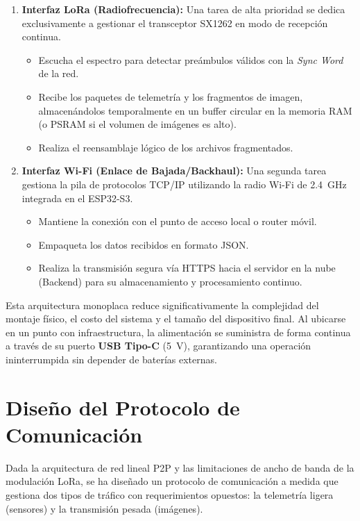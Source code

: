 \begin{enumerate}
  \item \textbf{Interfaz LoRa (Radiofrecuencia):}
    Una tarea de alta prioridad se dedica exclusivamente a gestionar el transceptor SX1262 en modo de recepción continua.
    \begin{itemize}
      \item Escucha el espectro para detectar preámbulos válidos con la \textit{Sync Word} de la red.
      \item Recibe los paquetes de telemetría y los fragmentos de imagen, almacenándolos temporalmente en un buffer circular en la memoria RAM (o PSRAM si el volumen de imágenes es alto).
      \item Realiza el reensamblaje lógico de los archivos fragmentados.
    \end{itemize}

  \item \textbf{Interfaz Wi-Fi (Enlace de Bajada/Backhaul):}
    Una segunda tarea gestiona la pila de protocolos TCP/IP utilizando la radio Wi-Fi de \SI{2.4}{\giga\hertz} integrada en el ESP32-S3.
    \begin{itemize}
      \item Mantiene la conexión con el punto de acceso local o router móvil.
      \item Empaqueta los datos recibidos en formato JSON.
      \item Realiza la transmisión segura vía HTTPS hacia el servidor en la nube (Backend) para su almacenamiento y procesamiento continuo.
    \end{itemize}
\end{enumerate}

Esta arquitectura monoplaca reduce significativamente la complejidad del montaje físico, el costo del sistema y el tamaño del dispositivo final. Al ubicarse en un punto con infraestructura, la alimentación se suministra de forma continua a través de su puerto \textbf{USB Tipo-C} (\SI{5}{\volt}), garantizando una operación ininterrumpida sin depender de baterías externas.


\section{Diseño del Protocolo de Comunicación}
\label{sec:diseno_protocolo}

Dada la arquitectura de red lineal P2P y las limitaciones de ancho de banda de la modulación LoRa, se ha diseñado un protocolo de comunicación a medida que gestiona dos tipos de tráfico con requerimientos opuestos: la telemetría ligera (sensores) y la transmisión pesada (imágenes).


